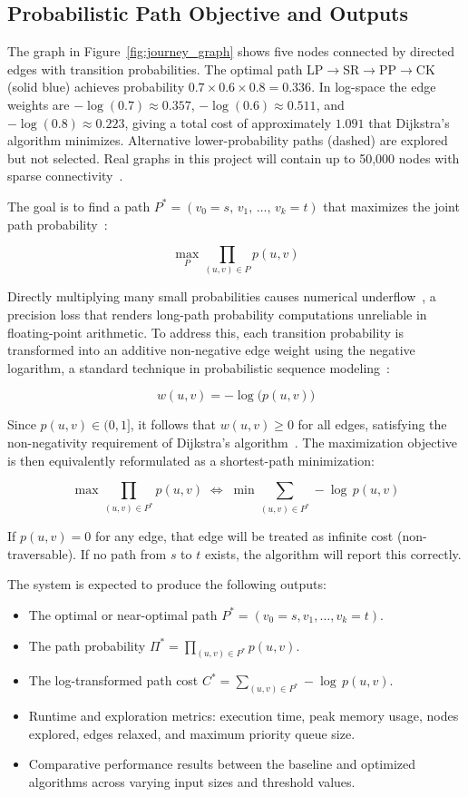 \subsection{Probabilistic Path Objective and Outputs}

The graph in Figure~\ref{fig:journey_graph} shows five nodes connected by directed edges with transition probabilities. The optimal path LP$\to$SR$\to$PP$\to$CK (solid blue) achieves probability $0.7\times0.6\times0.8=0.336$. In log-space the edge weights are $-\log(0.7)\approx0.357$, $-\log(0.6)\approx0.511$, and $-\log(0.8)\approx0.223$, giving a total cost of approximately $1.091$ that Dijkstra's algorithm minimizes. Alternative lower-probability paths (dashed) are explored but not selected. Real graphs in this project will contain up to 50,000 nodes with sparse connectivity~\citep{bucklin2003clickstream}.

The goal is to find a path $P^* = (v_0 = s,\, v_1,\, \ldots,\, v_k = t)$ that maximizes the joint path probability~\citep{norris1998markov}:

\[
\max_{P} \prod_{(u,v) \in P} p(u,v)
\]

Directly multiplying many small probabilities causes numerical underflow~\citep{manning2008nlp}, a precision loss that renders long-path probability computations unreliable in floating-point arithmetic. To address this, each transition probability is transformed into an additive non-negative edge weight using the negative logarithm, a standard technique in probabilistic sequence modeling~\citep{viterbi1967error,rabiner1989hmm}:

\[
w(u,v) = -\log\bigl(p(u,v)\bigr)
\]

Since $p(u,v) \in (0,1]$, it follows that $w(u,v) \geq 0$ for all edges, satisfying the non-negativity requirement of Dijkstra's algorithm~\citep{cormen2009}. The maximization objective is then equivalently reformulated as a shortest-path minimization:

\[
\max \prod_{(u,v)\in P^*} p(u,v) \;\iff\; \min \sum_{(u,v)\in P^*} -\log\, p(u,v)
\]

If $p(u,v) = 0$ for any edge, that edge will be treated as infinite cost (non-traversable). If no path from $s$ to $t$ exists, the algorithm will report this correctly.

The system is expected to produce the following outputs:
\begin{itemize}
    \item The optimal or near-optimal path $P^* = (v_0 = s, v_1, \ldots, v_k = t)$.
    \item The path probability $\Pi^* = \prod_{(u,v)\in P^*} p(u,v)$.
    \item The log-transformed path cost $C^* = \sum_{(u,v)\in P^*} -\log\, p(u,v)$.
    \item Runtime and exploration metrics: execution time, peak memory usage, nodes explored, edges relaxed, and maximum priority queue size.
    \item Comparative performance results between the baseline and optimized algorithms across varying input sizes and threshold values.
\end{itemize}


